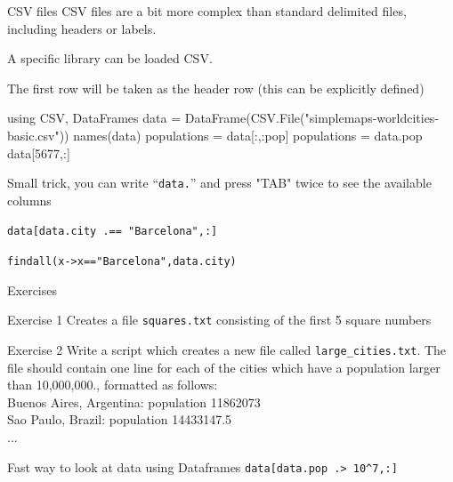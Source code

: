 \documentclass{beamer}
\newenvironment{Boxx}{\begin{tcolorbox}[standard jigsaw, opacityframe=0.8, opacityback=0.0,left=2pt,right=2pt,top=0pt,bottom=0pt]}{\end{tcolorbox}}
\begin{document}
\begin{frame}[fragile]{CSV files}
	CSV files are a bit more complex than standard delimited files, including headers or labels. 
	
	A specific library can be loaded {\color{red}CSV}. 
	
	The first row will be taken as the header row (this can be explicitly defined)

  \begin{Boxx}
  \begin{jllisting}
  	using CSV, DataFrames
	data = DataFrame(CSV.File("simplemaps-worldcities-basic.csv"))
	names(data)
	populations = data[:,:pop]
	populations = data.pop
	data[5677,:]
	\end{jllisting}
  \end{Boxx}
	
	
	
	Small trick, you can write ``\verb|data.|'' and press "TAB" twice to see the available columns
	
	
	\tiny
	{\color{gray}\verb|data[data.city .== "Barcelona",:]|
	
	\verb|findall(x->x=="Barcelona",data.city)|}
	
\end{frame}

\begin{frame}[fragile]{Exercises}
	\begin{block}{Exercise 1}
		Creates a file \verb|squares.txt| consisting of the first 5 square numbers
	\end{block}
	\begin{block}{Exercise 2}
		Write a script which creates a new file called \verb|large_cities.txt|.
		The file should contain one line for each of the cities which have a
		population larger than 10,000,000., formatted as follows:\\
		Buenos Aires, Argentina: population 11862073\\
		Sao Paulo, Brazil: population 14433147.5\\
		...
	\end{block}
	
	\pause
	
	{\color{gray} \tiny
	Fast way to look at data using Dataframes \verb|data[data.pop .> 10^7,:]|
	}
	
\end{frame}
\end{document}
